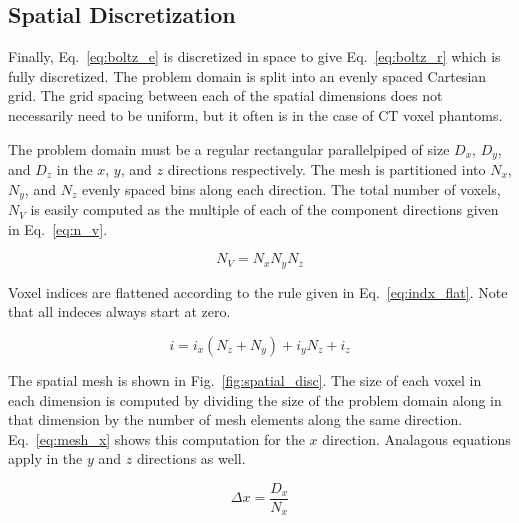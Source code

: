 \subsection{Spatial Discretization}

Finally, Eq.~\ref{eq:boltz_e} is discretized in space to give Eq.~\ref{eq:boltz_r} which is fully discretized. The problem domain is split into an evenly spaced Cartesian grid. The grid spacing between each of the spatial dimensions does not necessarily need to be uniform, but it often is in the case of CT voxel phantoms.

The problem domain must be a regular rectangular parallelpiped of size $D_x$, $D_y$, and $D_z$ in the $x$, $y$, and $z$ directions respectively. The mesh is partitioned into $N_x$, $N_y$, and $N_z$ evenly spaced bins along each direction. The total number of voxels, $N_V$ is easily computed as the multiple of each of the component directions given in Eq.~\ref{eq:n_v}.

\begin{equation} \label{eq:n_v}
	N_V = N_x N_y N_z
\end{equation}

Voxel indices are flattened according to the rule given in Eq.~\ref{eq:indx_flat}. Note that all indeces always start at zero.

\begin{equation} \label{eq:indx_flat}
	i = i_x (N_z + N_y) + i_y N_z + i_z
\end{equation}

The spatial mesh is shown in Fig.~\ref{fig:spatial_disc}. The size of each voxel in each dimension is computed by dividing the size of the problem domain along in that dimension by the number of mesh elements along the same direction. Eq.~\ref{eq:mesh_x} shows this computation for the $x$ direction. Analagous equations apply in the $y$ and $z$ directions as well.

\begin{equation} \label{eq:mesh_x}
\Delta x = \frac{D_x}{N_x}
\end{equation}

